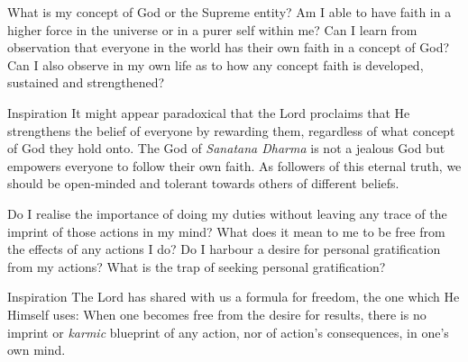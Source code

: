 \newpage
\begin{mananam}{} 
\mananamtext What is my concept of God or the Supreme entity? Am I able to have faith in a higher force in the universe or in a purer self within me? Can I learn from observation that everyone in the world has their own faith in a concept of God? Can I also observe in my own life as to how any concept faith is developed, sustained and strengthened?
\end{mananam}
\WritingHand{}
\begin{inspiration}{\mananamfont Inspiration}
\mananamtext It might appear paradoxical that the Lord proclaims that He strengthens the belief of everyone by rewarding them, regardless of what concept of God they hold onto. The God of \emph{Sanatana Dharma} is not a jealous God but empowers everyone to follow their own faith. As followers of this eternal truth, we should be open-minded and tolerant towards others of different beliefs. 
\end{inspiration}
\newpage




\newpage
\begin{mananam}{} 
\mananamtext Do I realise the importance of doing my duties without leaving any trace of the imprint of those actions in my mind? What does it mean to me to be free from the effects of any actions I do? 
Do I harbour a desire for personal gratification from my actions? What is the trap of seeking personal gratification?
\end{mananam}
\WritingHand{}
\begin{inspiration}{\mananamfont Inspiration}
\mananamtext The Lord has shared with us a formula for freedom, the one which He Himself uses: When one becomes free from the desire for results, there is no imprint or \emph{karmic} blueprint of any action, nor of action’s consequences, in one’s own mind.
\end{inspiration}
\newpage


